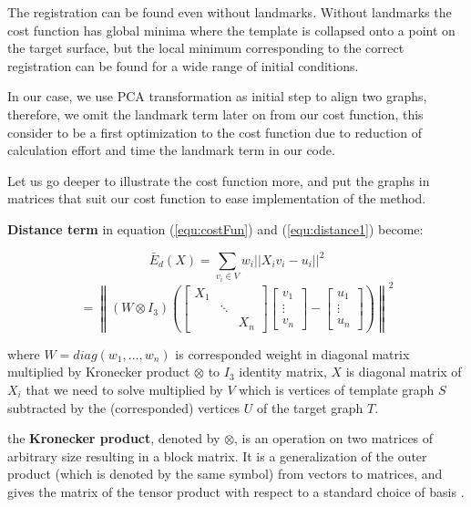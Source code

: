 \documentclass[../structure.tex]{subfiles}
\begin{document}
The registration can be found even without landmarks. Without landmarks the cost function has global minima where the template is collapsed onto a point on the target surface, but the local minimum corresponding to the correct registration can be found for a wide range of initial conditions.

In our case, we use PCA transformation as initial step to align two graphs, therefore, we omit the landmark term later on from our cost function, this consider to be a first optimization to the cost function due to reduction of calculation effort and time the landmark term in our code.

Let us go deeper to illustrate the cost function more, and put the graphs in matrices that suit our cost function to ease implementation of the method.

\textbf{Distance term} in equation (\ref{equ:costFun}) and (\ref{equ:distance1}) become:

\begin{equation}
\bar{E}_{d}(X) = \sum_{v_{i}\in V} w_{i}||X_{i}v_{i}-u_{i}||^2
\label{equ:distance2}
\end{equation}
\begin{equation*}
= \left\|(W \otimes I_{3}) \left(
\begin{bmatrix}
X_{1} & & \\
& \ddots & \\
& & X_{n}
\end{bmatrix}
\begin{bmatrix}
v_{1} \\ \vdots \\ v_{n}
\end{bmatrix} -
\begin{bmatrix}
u_{1}\\ \vdots \\ u_{n}
\end{bmatrix}
\right) \right\|^2
\end{equation*}

where $W = diag(w_{1},\dots, w_{n})$ is corresponded weight in diagonal matrix multiplied by Kronecker product $\otimes$ to $I_{3}$ identity matrix, $X$ is diagonal matrix of $X_{i}$ that we need to solve multiplied by $V$ which is vertices of template graph $S$ subtracted by the (corresponded) vertices $U$ of the target graph $T$.

the \textbf{Kronecker product}, denoted by $\otimes$, is an operation on two matrices of arbitrary size resulting in a block matrix. It is a generalization of the outer product (which is denoted by the same symbol) from vectors to matrices, and gives the matrix of the tensor product with respect to a standard choice of basis \cite{Wikipedia2019}.
\end{document}
